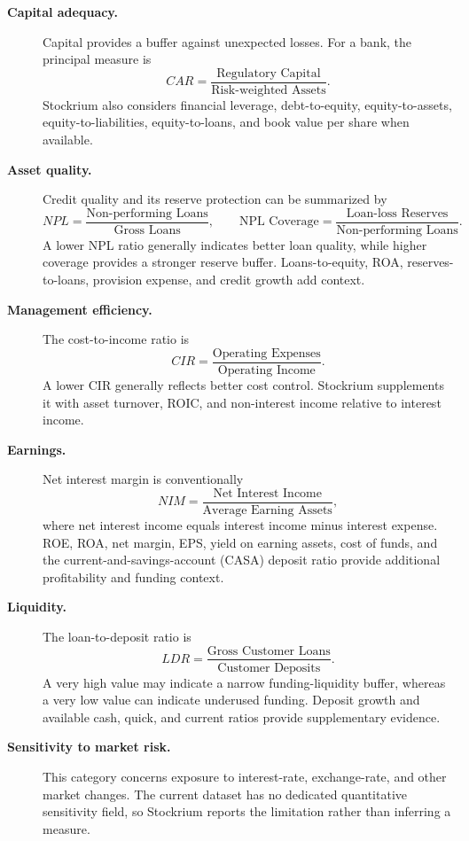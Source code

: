 \begin{description}
    \item[\textbf{Capital adequacy.}]
    Capital provides a buffer against unexpected losses. For a bank, the principal measure is
    \[
        CAR=\frac{\text{Regulatory Capital}}{\text{Risk-weighted Assets}}.
    \]
    Stockrium also considers financial leverage, debt-to-equity, equity-to-assets, equity-to-liabilities, equity-to-loans, and book value per share when available.

    \item[\textbf{Asset quality.}]
    Credit quality and its reserve protection can be summarized by
    \[
        NPL=\frac{\text{Non-performing Loans}}{\text{Gross Loans}},
        \qquad
        \text{NPL Coverage}
          =\frac{\text{Loan-loss Reserves}}{\text{Non-performing Loans}}.
    \]
    A lower NPL ratio generally indicates better loan quality, while higher coverage provides a stronger reserve buffer. Loans-to-equity, ROA, reserves-to-loans, provision expense, and credit growth add context.

    \item[\textbf{Management efficiency.}]
    The cost-to-income ratio is
    \[
        CIR=\frac{\text{Operating Expenses}}{\text{Operating Income}}.
    \]
    A lower CIR generally reflects better cost control. Stockrium supplements it with asset turnover, ROIC, and non-interest income relative to interest income.

    \item[\textbf{Earnings.}]
    Net interest margin is conventionally
    \[
        NIM=\frac{\text{Net Interest Income}}{\text{Average Earning Assets}},
    \]
    where net interest income equals interest income minus interest expense. ROE, ROA, net margin, EPS, yield on earning assets, cost of funds, and the current-and-savings-account (CASA) deposit ratio provide additional profitability and funding context.

    \item[\textbf{Liquidity.}]
    The loan-to-deposit ratio is
    \[
        LDR=\frac{\text{Gross Customer Loans}}{\text{Customer Deposits}}.
    \]
    A very high value may indicate a narrow funding-liquidity buffer, whereas a very low value can indicate underused funding. Deposit growth and available cash, quick, and current ratios provide supplementary evidence.

    \item[\textbf{Sensitivity to market risk.}]
    This category concerns exposure to interest-rate, exchange-rate, and other market changes. The current dataset has no dedicated quantitative sensitivity field, so Stockrium reports the limitation rather than inferring a measure.
\end{description}

